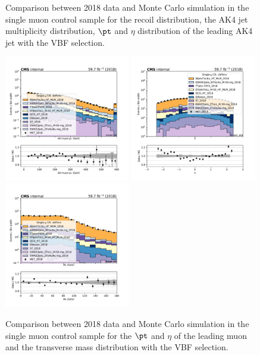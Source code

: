 {\begin{figure}[htbp]
\begin{center}
    \end{center}
    \caption{Comparison between 2018 data and Monte Carlo simulation in the single muon control sample for
        the recoil distribution, the AK4 jet multiplicity distribution,  $\pt$ and $\eta$ distribution
        of the leading AK4 jet with the VBF selection.}
    \label{fig:SM_vbfhinv_2018}
\end{figure}

\begin{figure}[htbp]
    \begin{center}
        \includegraphics[width=0.49\textwidth]{fig/datamc/cr_1m_vbf/cr_1m_vbf_muon_pt_losf_2018.pdf}
        \includegraphics[width=0.49\textwidth]{fig/datamc/cr_1m_vbf/cr_1m_vbf_muon_eta_losf_2018.pdf} \\
        \includegraphics[width=0.49\textwidth]{fig/datamc/cr_1m_vbf/cr_1m_vbf_muon_mt_losf_2018.pdf}
    \end{center}
    \caption{Comparison between 2018 data and Monte Carlo simulation in the single muon control sample for
        the $\pt$ and $\eta$ of the leading muon and the transverse mass distribution with the VBF selection.}
    \label{fig:SM_2_vbfhinv_2018}
\end{figure}

}

